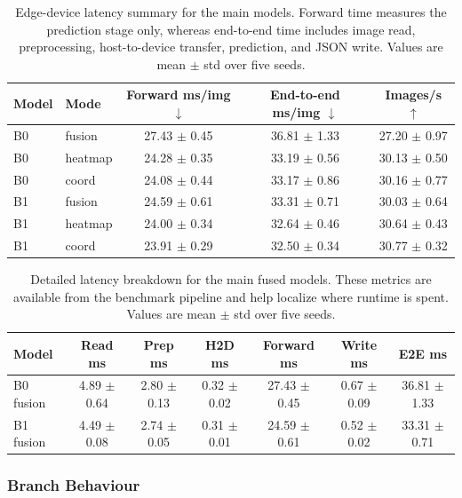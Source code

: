 \documentclass[10pt,letterpaper]{article}
\begin{document}
\begin{table}[H]
\centering
\footnotesize
\caption{Edge-device latency summary for the main models. Forward time measures the prediction stage only, whereas end-to-end time includes image read, preprocessing, host-to-device transfer, prediction, and JSON write. Values are mean $\pm$ std over five seeds.}
\label{tab:latency}
\begin{tabular}{llccc}
\toprule
Model & Mode & Forward ms/img $\downarrow$ & End-to-end ms/img $\downarrow$ & Images/s $\uparrow$ \\
\midrule
B0 & fusion & 27.43 $\pm$ 0.45 & 36.81 $\pm$ 1.33 & 27.20 $\pm$ 0.97 \\
B0 & heatmap & 24.28 $\pm$ 0.35 & 33.19 $\pm$ 0.56 & 30.13 $\pm$ 0.50 \\
B0 & coord & 24.08 $\pm$ 0.44 & 33.17 $\pm$ 0.86 & 30.16 $\pm$ 0.77 \\
B1 & fusion & 24.59 $\pm$ 0.61 & 33.31 $\pm$ 0.71 & 30.03 $\pm$ 0.64 \\
B1 & heatmap & 24.00 $\pm$ 0.34 & 32.64 $\pm$ 0.46 & 30.64 $\pm$ 0.43 \\
B1 & coord & 23.91 $\pm$ 0.29 & 32.50 $\pm$ 0.34 & 30.77 $\pm$ 0.32 \\
\bottomrule
\end{tabular}
\end{table}

\begin{table}[H]
\centering
\footnotesize
\caption{Detailed latency breakdown for the main fused models. These metrics are available from the benchmark pipeline and help localize where runtime is spent. Values are mean $\pm$ std over five seeds.}
\label{tab:latency_breakdown}
\begin{tabular}{lcccccc}
\toprule
Model & Read ms & Prep ms & H2D ms & Forward ms & Write ms & E2E ms \\
\midrule
B0 fusion & 4.89 $\pm$ 0.64 & 2.80 $\pm$ 0.13 & 0.32 $\pm$ 0.02 & 27.43 $\pm$ 0.45 & 0.67 $\pm$ 0.09 & 36.81 $\pm$ 1.33 \\
B1 fusion & 4.49 $\pm$ 0.08 & 2.74 $\pm$ 0.05 & 0.31 $\pm$ 0.01 & 24.59 $\pm$ 0.61 & 0.52 $\pm$ 0.02 & 33.31 $\pm$ 0.71 \\
\bottomrule
\end{tabular}
\end{table}

\subsubsection{Branch Behaviour}
\end{document}
